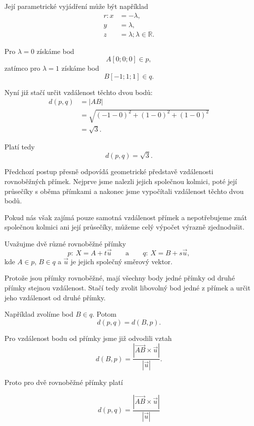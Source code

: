 \begin{example}
    Její parametrické vyjádření může být například
    \[
        \begin{aligned}
            r: x&=-\lambda,\\
            y&=\lambda,\\
            z&=\lambda; \lambda\in\mathbb{R}.
        \end{aligned}
    \]

    Pro $\lambda=0$ získáme bod
    \[
        A[0;0;0]\in p,
    \]
    zatímco pro $\lambda=1$ získáme bod
    \[
        B[-1;1;1]\in q.
    \]

    Nyní již stačí určit vzdálenost těchto dvou bodů:
    \begin{align*}
        d(p,q)
        &=
        |AB|\\
        &=
        \sqrt{(-1-0)^2+(1-0)^2+(1-0)^2}\\
        &=
        \sqrt3.
    \end{align*}

    Platí tedy
    \[
        d(p,q)=\sqrt3.
    \]
\end{example}

Předchozí postup přesně odpovídá geometrické představě vzdálenosti
rovnoběžných přímek. Nejprve jsme nalezli jejich společnou kolmici,
poté její průsečíky s oběma přímkami a nakonec jsme vypočítali
vzdálenost těchto dvou bodů.

Pokud nás však zajímá pouze samotná vzdálenost přímek a nepotřebujeme
znát společnou kolmici ani její průsečíky, můžeme celý výpočet
výrazně zjednodušit.

Uvažujme dvě různé rovnoběžné přímky
\[
    p:\ X=A+t\vec{u}
    \qquad\text{a}\qquad
    q:\ X=B+s\vec{u},
\]
kde $A\in p$, $B\in q$ a $\vec{u}$ je jejich společný směrový vektor.

Protože jsou přímky rovnoběžné, mají všechny body jedné přímky
od druhé přímky stejnou vzdálenost. Stačí tedy zvolit libovolný
bod jedné z přímek a určit jeho vzdálenost od druhé přímky.

Například zvolíme bod $B\in q$. Potom
\[
    d(p,q)=d(B,p).
\]

Pro vzdálenost bodu od přímky jsme již odvodili vztah
\[
    d(B,p)
    =
    \frac{
        |\overrightarrow{AB}\times\vec{u}|
    }{
        |\vec{u}|
    }.
\]

Proto pro dvě rovnoběžné přímky platí

\begin{equation}
        d(p,q)
        =
        \frac{
            |\overrightarrow{AB}\times\vec{u}|
        }{
            |\vec{u}|
        }
    \label{eq:Distance_parallel_lines_space}
\end{equation}

